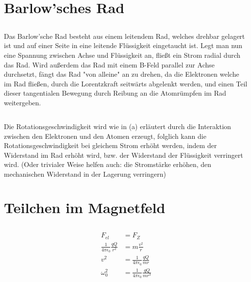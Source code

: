 \documentclass[11pt]{article}
\begin{document}
\section{Barlow'sches Rad}
\subsection{}
\begin{adjustwidth}{20pt}{}
    Das Barlow'sche Rad besteht aus einem leitendem Rad, welches drehbar 
    gelagert ist und auf einer Seite in eine leitende Flüssigkeit eingetaucht 
    ist. Legt man nun eine Spannung zwischen Achse und Flüssigkeit an,
    fließt ein Strom radial durch das Rad. Wird außerdem das Rad
    mit einem B-Feld parallel zur Achse durchsetzt,
    fängt das Rad "von alleine" an zu drehen, da die Elektronen welche im Rad fließen,
    durch die Lorentzkraft seitwärts abgelenkt werden, und einen Teil
    dieser tangentialen Bewegung durch Reibung an die Atomrümpfen im Rad weitergeben.
\end{adjustwidth}
    
\subsection{}
\begin{adjustwidth}{20pt}{}
    Die Rotationsgeschwindigkeit wird wie in (a) erläutert durch die Interaktion zwischen 
    den Elektronen und den Atomen erzeugt, folglich kann die Rotationsgeschwindigkeit bei gleichem Strom erhöht werden, 
    indem der Widerstand im Rad erhöht wird, bzw. der Widerstand der Flüssigkeit
    verringert wird. (Oder trivialer Weise helfen auch: die Stromstärke erhöhen,
    den mechanischen Widerstand in der Lagerung verringern)
\end{adjustwidth}

\section{Teilchen im Magnetfeld}
\subsection{}
\begin{align*}
    F_{el} &= F_Z\\
    \frac{1}{4\pi \epsilon_0}\frac{q Q}{r^2} &= m \frac{v^2}{r}\\
    v^2 &=  \frac{1}{4\pi \epsilon_0}\frac{q Q}{m r}\\
    \omega_0^2 &= \frac{1}{4\pi \epsilon_0}\frac{q Q}{m r^3}\\
\end{align*}
\end{document}
